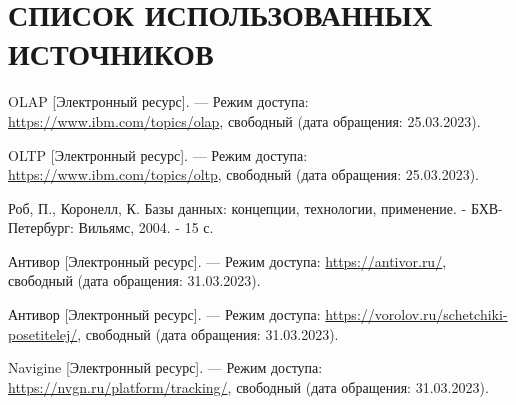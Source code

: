 \section*{СПИСОК ИСПОЛЬЗОВАННЫХ ИСТОЧНИКОВ}
\begingroup
\renewcommand{\section}[2]{}
\begin{thebibliography}{}
	
	OLAP [Электронный ресурс]. --- Режим доступа: \url{https://www.ibm.com/topics/olap}, свободный (дата обращения: 25.03.2023).

	OLTP [Электронный ресурс]. --- Режим доступа: \url{https://www.ibm.com/topics/oltp}, свободный (дата обращения: 25.03.2023).
    
    Роб, П., Коронелл, К. Базы данных: концепции, технологии, применение. - БХВ-Петербург: Вильямс, 2004. - 15 с.

    Антивор [Электронный ресурс]. --- Режим доступа: \url{https://antivor.ru/}, свободный (дата обращения: 31.03.2023).

    Антивор [Электронный ресурс]. --- Режим доступа: \url{https://vorolov.ru/schetchiki-posetitelej/}, свободный (дата обращения: 31.03.2023).

    Navigine [Электронный ресурс]. --- Режим доступа: \url{https://nvgn.ru/platform/tracking/}, свободный (дата обращения: 31.03.2023).

\end{thebibliography}
\endgroup

\pagebreak